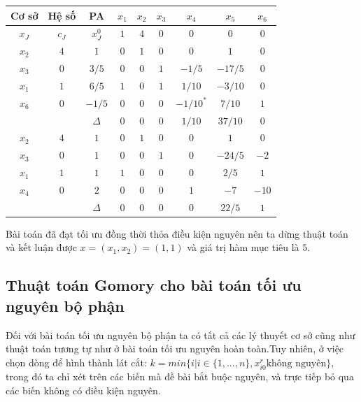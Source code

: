 \documentclass[12pt,a4paper]{report}
\begin{document}
     \begin{center}
         \begin{tabular}{|c|c|c|c|c|c|c|c|c|}
        \hline
         Cơ sở & Hệ số & PA& $x_1$ &$x_2$ &$ x_3$ &$x_4$ &$x_5$ &$x_6$\\
        \hline
        $x_J$ &$c_J$ &$x_J^0$ &$1$ &$4$ &$0$ &$0$ &$0$ &$0$\\
        \hline
        $x_2$ &$4$ &$1$ &$0$ &$1$ &$0$ &$0$ &$1$ &$0$\\
        $x_3$ &$0$ &$3/5$ &$0$ &$0$ &$1$ &$-1/5$ &$-17/5$ & $0$\\
        $x_1$ &$1$ &$6/5$ &$1$ &$0$ &$1$ &$1/10$&$-3/10$ &$0$\\
        $x_6$ &$0$ &$-1/5$ &$0$ &$0$ & $0$ &$-1/10^*$ &$7/10$ &$1$\\
        \hline
        && $\Delta$ &$0$ &$0$ &$0$ &$1/10$ &$37/10$ &$0$\\
        \hline
        $x_2$ &$4$ &$1$ &$0$ &$1$ &$0$ &$0$ &$1$ &$0$\\
        $x_3$ &$0$ &$1$ &$0$ &$0$ &$1$ &$0$ &$-24/5$ &$-2$\\
        $x_1$ &$1$ &$1$ &$1$ &$0$ &$0$ &$0$ &$2/5$ &$1$\\
        $x_4$ &$0$ &$2$ &$0$ &$0$ &$0$ &$1$ &$-7$ &$-10$\\
        \hline
        && $\Delta$ &$0$ &$0$ &$0$ &$0$&$ 22/5$ &$1$\\
        \hline
        
         \end{tabular}
     \end{center}
     Bài toán đã đạt tối ưu đồng thời thỏa điều kiện nguyên nên ta dừng thuật toán và kết luận được $x=(x_1,x_2)=(1,1)$ và giá trị hàm mục tiêu là $5$.
\subsection{Thuật toán Gomory cho bài toán tối ưu nguyên bộ phận}
 Đối với bài toán tối ưu nguyên bộ phận ta có tất cả các lý thuyết cơ sở cũng như thuật toán tương tự như ở bài toán tối ưu nguyên hoàn toàn.Tuy nhiên, ở việc chọn dòng để hình thành lát cắt:
 $k=min\{i|i\in \{1,...,n\},x_{i0}^r \text{không nguyên}\}$, trong đó ta chỉ xét trên các biến mà đề bài bắt buộc nguyên, và trực tiếp bỏ qua các biến không có điều kiện nguyên.
\end{document}
